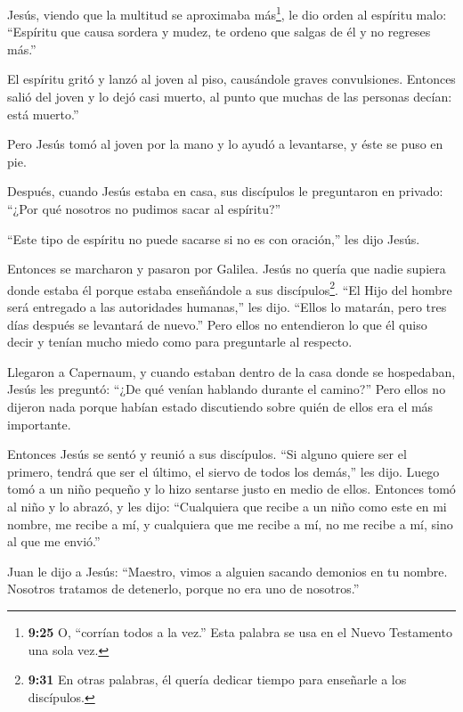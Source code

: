  Jesús, viendo que la multitud se aproximaba
más\footnote{\textbf{9:25} O, ``corrían todos a la vez.'' Esta palabra
  se usa en el Nuevo Testamento una sola vez.}, le dio orden al espíritu
malo: ``Espíritu que causa sordera y mudez, te ordeno que salgas de él y
no regreses más.''

 El espíritu gritó y lanzó al joven al piso, causándole
graves convulsiones. Entonces salió del joven y lo dejó casi muerto, al
punto que muchas de las personas decían: está muerto.''

 Pero Jesús tomó al joven por la mano y lo ayudó a
levantarse, y éste se puso en pie.

 Después, cuando Jesús estaba en casa, sus discípulos le
preguntaron en privado: ``¿Por qué nosotros no pudimos sacar al
espíritu?''

 ``Este tipo de espíritu no puede sacarse si no es con
oración,'' les dijo Jesús.

 Entonces se marcharon y pasaron por Galilea. Jesús no
quería que nadie supiera donde estaba él  porque estaba
enseñándole a sus discípulos\footnote{\textbf{9:31} En otras palabras,
  él quería dedicar tiempo para enseñarle a los discípulos.}. ``El Hijo
del hombre será entregado a las autoridades humanas,'' les dijo. ``Ellos
lo matarán, pero tres días después se levantará de nuevo.''
 Pero ellos no entendieron lo que él quiso decir y tenían
mucho miedo como para preguntarle al respecto.

 Llegaron a Capernaum, y cuando estaban dentro de la casa
donde se hospedaban, Jesús les preguntó: ``¿De qué venían hablando
durante el camino?''  Pero ellos no dijeron nada porque
habían estado discutiendo sobre quién de ellos era el más importante.

 Entonces Jesús se sentó y reunió a sus discípulos. ``Si
alguno quiere ser el primero, tendrá que ser el último, el siervo de
todos los demás,'' les dijo.  Luego tomó a un niño pequeño
y lo hizo sentarse justo en medio de ellos. Entonces tomó al niño y lo
abrazó, y les dijo:  ``Cualquiera que recibe a un niño como
este en mi nombre, me recibe a mí, y cualquiera que me recibe a mí, no
me recibe a mí, sino al que me envió.''

 Juan le dijo a Jesús: ``Maestro, vimos a alguien sacando
demonios en tu nombre. Nosotros tratamos de detenerlo, porque no era uno
de nosotros.''

